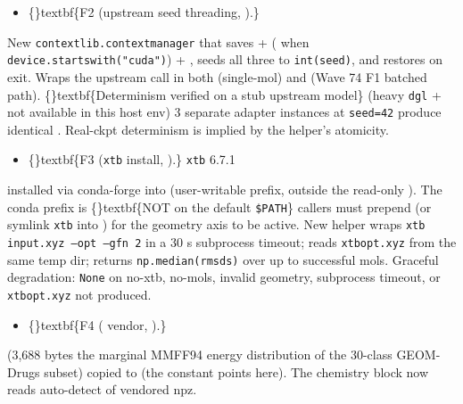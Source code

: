 \documentclass{article}
\begin{document}
\begin{itemize}
\item \{\}textbf\{F2 (upstream seed threading, ).\}
\end{itemize}
New  \texttt{contextlib.contextmanager} that saves  + ( when \texttt{device.startswith("cuda")}) + , seeds all three to \texttt{int(seed)}, and restores on exit. Wraps the upstream  call in both  (single-mol) and  (Wave 74 F1 batched path). \{\}textbf\{Determinism verified on a stub upstream model\} (heavy \texttt{dgl} +  not available in this host env)  3 separate adapter instances at \texttt{seed=42} produce identical . Real-ckpt determinism is implied by the helper's atomicity.

\begin{itemize}
\item \{\}textbf\{F3 (\texttt{xtb} install, ).\} \texttt{xtb} 6.7.1
\end{itemize}
installed via conda-forge into  (user-writable prefix, outside the read-only ). The conda prefix is \{\}textbf\{NOT on the default \texttt{\$PATH}\}  callers must prepend  (or symlink \texttt{xtb} into ) for the geometry axis to be active. New  helper wraps \texttt{xtb input.xyz --opt --gfn 2} in a 30 s subprocess timeout; reads \texttt{xtbopt.xyz} from the same temp dir; returns \texttt{np.median(rmsds)} over up to  successful mols. Graceful degradation: \texttt{None} on no-xtb, no-mols, invalid geometry, subprocess timeout, or \texttt{xtbopt.xyz} not produced.

\begin{itemize}
\item \{\}textbf\{F4 ( vendor, ).\}
\end{itemize}
 (3,688 bytes  the marginal MMFF94 energy distribution of the 30-class GEOM-Drugs subset) copied to  (the  constant points here). The chemistry block now reads   auto-detect of vendored npz.
\end{document}
